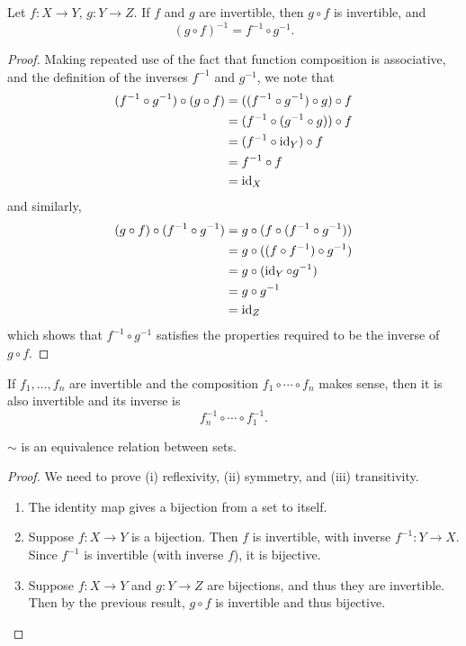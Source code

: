 \begin{proposition}
Let $f:X \to Y$, $g:Y \to Z$. If $f$ and $g$ are invertible, then $g \circ f$ is invertible, and
\[(g \circ f)^{-1}=f^{-1}\circ g^{-1}.\]
\end{proposition}

\begin{proof}
Making repeated use of the fact that function composition is associative, and the definition of the inverses $f^{-1}$ and $g^{-1}$, we note that
\begin{align*}
(f^{-1}\circ g^{-1}) \circ (g \circ f) 
&= ((f^{-1} \circ g^{-1}) \circ g) \circ f \\
&= (f^{-1} \circ (g^{-1} \circ g)) \circ f \\
&= (f^{-1} \circ \operatorname{id}_Y) \circ f \\
&= f^{-1} \circ f \\
&= \operatorname{id}_X
\end{align*}
and similarly,
\begin{align*}
(g \circ f) \circ (f^{-1} \circ g^{-1}) 
&= g \circ (f \circ (f^{-1} \circ g^{-1})) \\
&= g \circ ((f \circ f^{-1}) \circ g^{-1}) \\
&= g \circ (\operatorname{id}_Y \circ g^{-1}) \\
&= g \circ g^{-1} \\
&= \operatorname{id}_Z
\end{align*}
which shows that $f^{-1} \circ g^{-1}$ satisfies the properties required to be the inverse of $g \circ f$.
\end{proof}

\begin{corollary}
If $f_1,\dots,f_n$ are invertible and the composition $f_1\circ\cdots\circ f_n$ makes sense, then it is also invertible and its inverse is
\[f_n^{-1}\circ\cdots\circ f_1^{-1}.\]
\end{corollary}

\begin{proposition}
$\sim$ is an equivalence relation between sets.
\end{proposition}

\begin{proof}
We need to prove (i) reflexivity, (ii) symmetry, and (iii) transitivity.
\begin{enumerate}[label=(\roman*)]
\item The identity map gives a bijection from a set to itself.
\item Suppose $f:X\to Y$ is a bijection. Then $f$ is invertible, with inverse $f^{-1}:Y\to X$. Since $f^{-1}$ is invertible (with inverse $f$), it is bijective.
\item Suppose $f:X\to Y$ and $g:Y\to Z$ are bijections, and thus they are invertible. Then by the previous result, $g\circ f$ is invertible and thus bijective.
\end{enumerate}
\end{proof}

